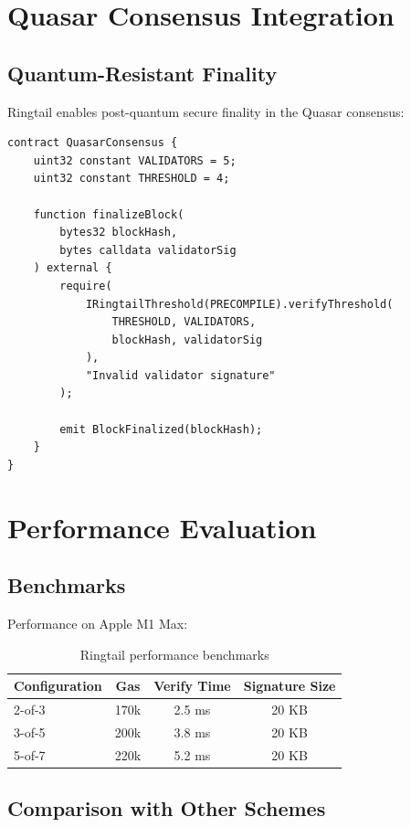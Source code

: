 \documentclass[11pt,a4paper]{article}
\theoremstyle{definition}
\begin{document}
\section{Quasar Consensus Integration}

\subsection{Quantum-Resistant Finality}

Ringtail enables post-quantum secure finality in the Quasar consensus:

\begin{lstlisting}[language=Solidity]
contract QuasarConsensus {
    uint32 constant VALIDATORS = 5;
    uint32 constant THRESHOLD = 4;

    function finalizeBlock(
        bytes32 blockHash,
        bytes calldata validatorSig
    ) external {
        require(
            IRingtailThreshold(PRECOMPILE).verifyThreshold(
                THRESHOLD, VALIDATORS,
                blockHash, validatorSig
            ),
            "Invalid validator signature"
        );

        emit BlockFinalized(blockHash);
    }
}
\end{lstlisting}

\section{Performance Evaluation}

\subsection{Benchmarks}

Performance on Apple M1 Max:

\begin{table}[h]
\centering
\begin{tabular}{lccc}
\toprule
Configuration & Gas & Verify Time & Signature Size \\
\midrule
2-of-3 & 170k & 2.5 ms & 20 KB \\
3-of-5 & 200k & 3.8 ms & 20 KB \\
5-of-7 & 220k & 5.2 ms & 20 KB \\
\bottomrule
\end{tabular}
\caption{Ringtail performance benchmarks}
\end{table}

\subsection{Comparison with Other Schemes}
\end{document}
